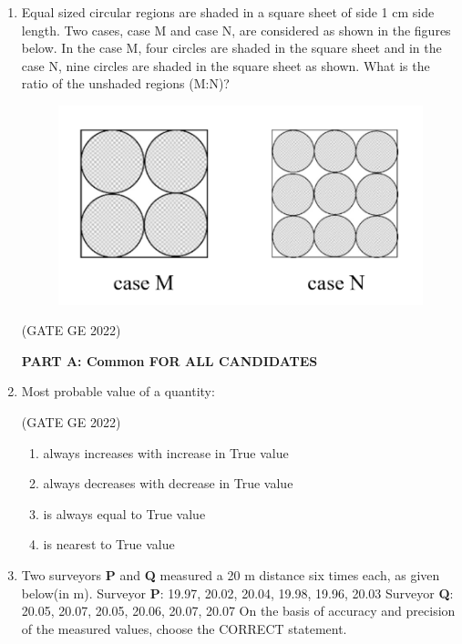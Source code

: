 \documentclass[journal,12pt,onecolumn]{IEEEtran}
\theoremstyle{remark}
\begin{document}
\begin{enumerate}
\item Equal sized circular regions are shaded in a square sheet of side 1 cm side length. Two cases, case M and case N, are considered as shown in the figures below. In the case M, four circles are shaded in the square sheet and in the case N, nine circles are shaded in the square sheet as shown.
What is the ratio of the unshaded regions (M:N)?
\begin{figure}[H]
    \centering
    \includegraphics[width=0.4\columnwidth]{figs/fig_10.png}
    \label{fig:placeholder}
\end{figure}

\hfill (GATE GE 2022)

\begin{enumerate}
\end{enumerate}

\textbf{PART A: Common FOR ALL CANDIDATES}

\item Most probable value of a quantity:

\hfill (GATE GE 2022)

\begin{enumerate}
    \item always increases with increase in True value
    \item always decreases with decrease in True value
    \item is always equal to True value
    \item is nearest to True value
\end{enumerate}

\item Two surveyors \textbf{P} and \textbf{Q} measured a 20 m distance six times each, as given below(in m).
Surveyor \textbf{P}: 19.97, 20.02, 20.04, 19.98, 19.96, 20.03
Surveyor \textbf{Q}: 20.05, 20.07, 20.05, 20.06, 20.07, 20.07
On the basis of accuracy and precision of the measured values, choose the CORRECT statement.


\end{enumerate}
\end{document}
